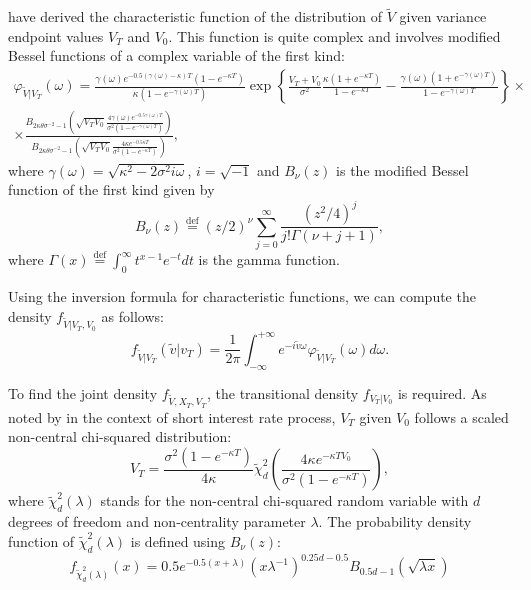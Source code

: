 \documentclass{rQUF2e}
\theoremstyle{plain}
\theoremstyle{definition}
\begin{document}
	\citet{broadie_kaya} have derived the characteristic function of the distribution of $\widetilde{V}$ given variance endpoint values $V_T$ and $V_0$. This function is quite complex and involves modified Bessel functions of a complex variable of the first kind:
	\begin{multline}
	\varphi_{\widetilde{V}|V_T}(\omega) = \frac{\gamma(\omega)e^{-0.5(\gamma(\omega) - \kappa)T}(1 - e^{-\kappa T})}{\kappa (1 - e^{-\gamma(\omega)T})} \exp \left\{ \frac{V_T + V_0}{\sigma^2} \frac{\kappa (1 + e^{-\kappa T})}{1 - e^{-\kappa T}} - \frac{\gamma(\omega) (1 + e^{-\gamma(\omega) T})}{1 - e^{-\gamma(\omega) T}} \right\} \times \\
	\times \frac{B_{2 \kappa \theta \sigma^{-2} - 1} \left( \sqrt{V_T V_0}
		 \frac{4 \gamma(\omega) e^{-0.5 \gamma(\omega) T}}{\sigma^2 (1 - e^{-\gamma(\omega) T})} \right)}{B_{2 \kappa \theta \sigma^{-2} - 1} \left( \sqrt{V_T V_0} \frac{4 \kappa e^{-0.5 \kappa T}}{\sigma^2 (1 - e^{-\kappa T})} \right)},
	\end{multline}
	where $\gamma(\omega) = \sqrt{\kappa^2 - 2\sigma^2 i \omega}$, $i = \sqrt{-1}$ and $B_{\nu}(z)$ is the modified Bessel function of the first kind given by
	\begin{equation*}
	B_{\nu}(z) \stackrel{\operatorname{def}}{=} (z/2)^{\nu} \sum_{j=0}^{\infty} \frac{(z^2/4)^j}{j! \Gamma(\nu + j + 1)},
	\end{equation*}
	where $\Gamma(x) \stackrel{\operatorname{def}}{=} \int_0^{\infty} t^{x-1} e^{-t} dt$ is the gamma function.
	
	Using the inversion formula for characteristic functions, we can compute the density $f_{\widetilde{V}|V_T, V_0}$ as follows:
	\begin{equation*}
	f_{\widetilde{V}|V_T}(\widetilde{v}|v_T) = \frac{1}{2 \pi} \int_{-\infty}^{+\infty} e^{-i\widetilde{v} \omega} \varphi_{\widetilde{V}|V_T} (\omega) d\omega.
	\end{equation*}
	
	To find the joint density $f_{\widetilde{V}, X_T, V_T}$, the transitional density $f_{V_T|V_0}$ is required. As noted by \citet{cox_et_al} in the context of short interest rate process, $V_T$ given $V_0$ follows a scaled non-central chi-squared distribution:
	\begin{equation}
	V_T = \frac{\sigma^2 (1 - e^{-\kappa T})}{4 \kappa} \widetilde{\chi}_d^2 \left( \frac{4 \kappa e^{- \kappa T V_0}}{\sigma^2 (1 - e^{-\kappa T})} \right),
	\end{equation}
	where $\widetilde{\chi}_d^2 (\lambda)$ stands for the non-central chi-squared random variable with $d$ degrees of freedom and non-centrality parameter $\lambda$. The probability density function of $\widetilde{\chi}_d^2 (\lambda)$ is defined using $B_{\nu}(z)$:
	\begin{equation*}
	f_{\widetilde{\chi}_d^2 (\lambda)}(x) = 0.5 e^{-0.5(x+\lambda)} (x \lambda^{-1})^{0.25d-0.5} B_{0.5 d-1}(\sqrt{\lambda x})
	\end{equation*}
	
\end{document}
